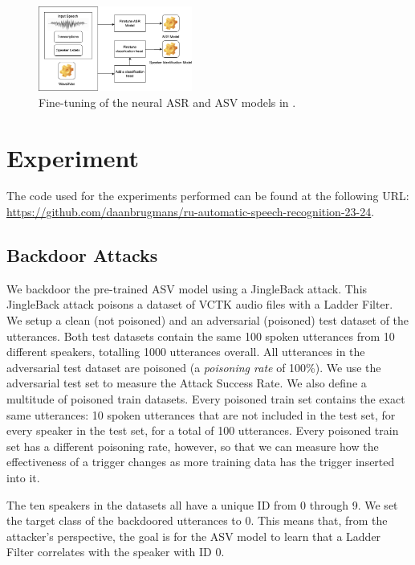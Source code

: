 \documentclass[11pt]{article}
\begin{document}
\begin{figure}
  \centering
  \includegraphics[width=0.45\textwidth]{roddeman_etal_models.png}
  \caption{Fine-tuning of the neural ASR and ASV models in \citet{roddeman2024anonymization}.}
  \label{fig:roddeman_etal_models}
\end{figure}

\section{Experiment}
The code used for the experiments performed can be found at the following URL: \url{https://github.com/daanbrugmans/ru-automatic-speech-recognition-23-24}.

\subsection{Backdoor Attacks}
We backdoor the pre-trained ASV model using a JingleBack attack.
This JingleBack attack poisons a dataset of VCTK audio files with a Ladder Filter.
We setup a clean (not poisoned) and an adversarial (poisoned) test dataset of the utterances.
Both test datasets contain the same 100 spoken utterances from 10 different speakers, totalling 1000 utterances overall.
All utterances in the adversarial test dataset are poisoned (a \textit{poisoning rate} of 100\%).
We use the adversarial test set to measure the Attack Success Rate.
We also define a multitude of poisoned train datasets.
Every poisoned train set contains the exact same utterances: 10 spoken utterances that are not included in the test set, for every speaker in the test set, for a total of 100 utterances.
Every poisoned train set has a different poisoning rate, however, so that we can measure how the effectiveness of a trigger changes as more training data has the trigger inserted into it.

The ten speakers in the datasets all have a unique ID from 0 through 9.
We set the target class of the backdoored utterances to 0.
This means that, from the attacker's perspective, the goal is for the ASV model to learn that a Ladder Filter correlates with the speaker with ID 0.
\end{document}
